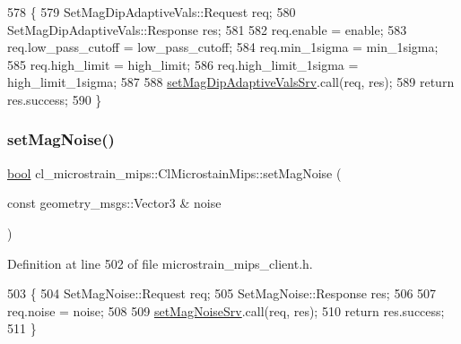 \begin{DoxyCode}
578     \{
579         SetMagDipAdaptiveVals::Request req;
580         SetMagDipAdaptiveVals::Response res;
581 
582         req.enable = enable;
583         req.low\_pass\_cutoff = low\_pass\_cutoff;
584         req.min\_1sigma = min\_1sigma;
585         req.high\_limit = high\_limit;
586         req.high\_limit\_1sigma = high\_limit\_1sigma;
587 
588         \hyperlink{classcl__microstrain__mips_1_1ClMicrostainMips_a3618b27ce1ed75f2e498c0bc6a36599d}{setMagDipAdaptiveValsSrv}.call(req, res);
589         \textcolor{keywordflow}{return} res.success;
590     \}
\end{DoxyCode}
\mbox{\label{classcl__microstrain__mips_1_1ClMicrostainMips_a6c9825168b47aa42091e410da90f43c8}} 
\subsubsection{\texorpdfstring{set\+Mag\+Noise()}{setMagNoise()}}
{\footnotesize\ttfamily \hyperlink{classbool}{bool} cl\+\_\+microstrain\+\_\+mips\+::\+Cl\+Microstain\+Mips\+::set\+Mag\+Noise (\begin{DoxyParamCaption}\item[{const geometry\+\_\+msgs\+::\+Vector3 \&}]{noise }\end{DoxyParamCaption})\hspace{0.3cm}{\ttfamily [inline]}}



Definition at line 502 of file microstrain\+\_\+mips\+\_\+client.\+h.


\begin{DoxyCode}
503     \{
504         SetMagNoise::Request req;
505         SetMagNoise::Response res;
506 
507         req.noise = noise;
508 
509         \hyperlink{classcl__microstrain__mips_1_1ClMicrostainMips_a0a6ed1132b9cca45536598e78c8b23cc}{setMagNoiseSrv}.call(req, res);
510         \textcolor{keywordflow}{return} res.success;
511     \}
\end{DoxyCode}
\mbox{\label{classcl__microstrain__mips_1_1ClMicrostainMips_a2dae9cbd60e135e149117d6af14e6b27}} 
